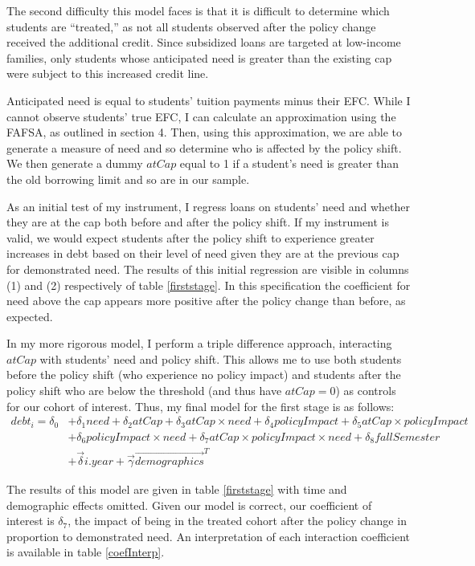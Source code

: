 \documentclass[12pt]{article}
\begin{document}
	The second difficulty this model faces is that it is difficult to determine which students are ``treated,'' as not all students observed after the policy change received the additional credit. Since subsidized loans are targeted at low-income families, only students whose anticipated need is greater than the existing cap were subject to this increased credit line. 
	
	Anticipated need is equal to students' tuition payments minus their EFC. While I cannot observe students' true EFC, I can calculate an approximation using the FAFSA, as outlined in section 4. Then, using this approximation, we are able to generate a measure of need and so determine who is affected by the policy shift. We then generate a dummy $atCap$ equal to 1 if a student's need is greater than the old borrowing limit and so are in our sample. 
	
	As an initial test of my instrument, I regress loans on students' need and whether they are at the cap both before and after the policy shift. If my instrument is valid, we would expect students after the policy shift to experience greater increases in debt based on their level of need given they are at the previous cap for demonstrated need. The results of this initial regression are visible in columns (1) and (2) respectively of table \ref{firststage}. In this specification the coefficient for need above the cap appears more positive after the policy change than before, as expected. 
	
	In my more rigorous model, I perform a triple difference approach, interacting $atCap$ with students' need and policy shift. This allows me to use both students before the policy shift (who experience no policy impact) and students after the policy shift who are below the threshold (and thus have $atCap = 0$) as controls for our cohort of interest. Thus, my final model for the first stage is as follows: 
	\begin{align*}
	debt_i = \delta_0 &+ \delta_1 need + \delta_2 atCap + \delta_3 atCap \times need + \delta_4 policyImpact + \delta_5 atCap \times policyImpact\\
	 &+ \delta_6 policyImpact \times need + \delta_7 atCap \times policyImpact \times need + \delta_8 fallSemester \\
	 &+ \vec{\delta} i.year + \vec{\gamma} \vec{demographics}^T
	 \end{align*} 
	 
	 The results of this model are given in table \ref{firststage} with time and demographic effects omitted. Given our model is correct, our coefficient of interest is $\delta_7$, the impact of being in the treated cohort after the policy change in proportion to demonstrated need. An interpretation of each interaction coefficient is available in table \ref{coefInterp}.
	 
\end{document}
